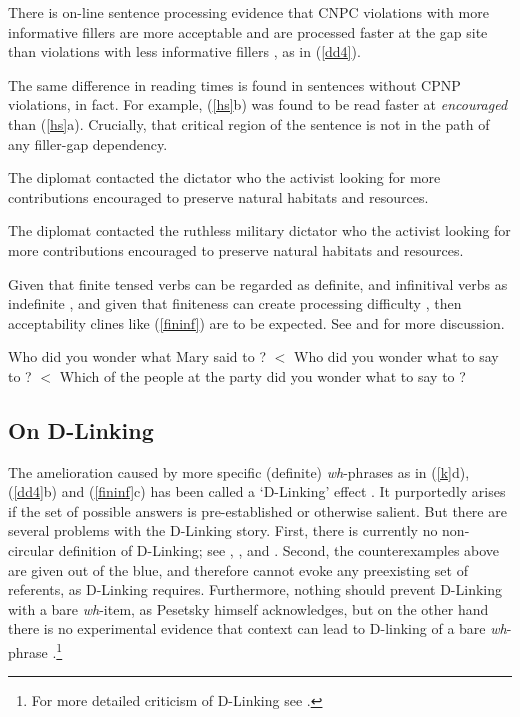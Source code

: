 \documentclass[output=paper
 	        ,biblatex
                ,babelshorthands
                ,newtxmath
                ,draftmode
                ,colorlinks, citecolor=brown
]{langscibook}
\begin{document}
\indent
There is on-line sentence processing evidence that   CNPC   violations  with more informative  fillers are more acceptable and are processed faster at the gap site than violations with less informative fillers \citep{hofsaglang}, as in  (\ref{dd4}).
 
\eal \label{dd4}
\zl



\noindent
The same difference in reading times  is found in sentences without CPNP violations, in fact. For example,  (\ref{hs}b) was found to be read faster at \emph{encouraged} than (\ref{hs}a). Crucially, that critical region of the sentence is not in the path of any filler-gap dependency.
 
\eal \label{hs}
 \ex The diplomat contacted the dictator who the activist looking for more contributions encouraged to preserve natural habitats and resources.
 
 \ex The diplomat contacted the ruthless military dictator who the activist looking for more contributions encouraged to preserve natural habitats and resources.
 \zl



Given that  finite tensed verbs can be regarded as definite, and infinitival verbs as indefinite \citep{partee84}, and given that finiteness can create processing difficulty 
 \citep{kluender92,gibson0000}, then acceptability clines like 
(\ref{fininf}) are to be expected. See \citet[Chapter 5]{levhubook} and \citet[308]{levine17} for more discussion.

\eal \label{fininf}
\ex Who did you wonder what Mary said to \spc?  $<$
\ex Who did you wonder what to say to \spc?  $<$
\ex Which of the people at the party did you wonder what to say to \spc? 
\zl

\subsection{On D-Linking}

The amelioration caused by more specific (definite) \emph{wh}-phrases as in  (\ref{k}d), (\ref{dd4}b) and (\ref{fininf}c)  has been called a `D-Linking' effect  \citep{pesetskydlink,pesetskybook}. It purportedly arises if the set of possible answers is pre-established or otherwise salient. But there are several problems with the D-Linking story.   First, there is currently no non-circular definition of D-Linking; see 
\citet[16]{pesetskybook},
 \citet[247--250]{ginzsag}, 
 \citet[33, 39]{chung94} and
\citet[242, 268--271]{levhubook}. Second, the counterexamples above are given out of the blue, and therefore cannot evoke any preexisting set of referents, as D-Linking 
requires.   Furthermore, nothing should prevent D-Linking with a bare \emph{wh}-item, as Pesetsky himself acknowledges, but on the other hand there is no experimental evidence that context can lead to D-linking of a bare \emph{wh}-phrase \citep{sprousediss07,villata}.\footnote{For more detailed criticism of D-Linking see \citet{hof2007}.}
\end{document}
